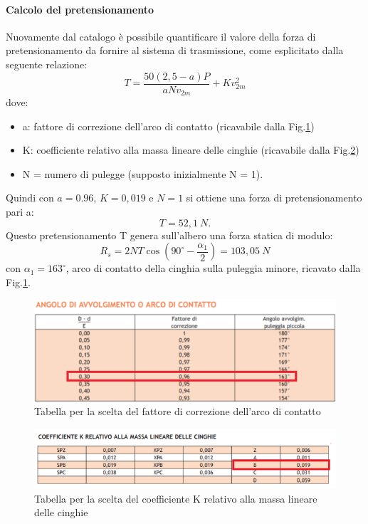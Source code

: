 \paragraph{Calcolo del pretensionamento}Nuovamente dal catalogo è possibile quantificare il valore della forza di pretensionamento da fornire al sistema di trasmissione, come esplicitato dalla seguente relazione: 
\begin{equation}
    T=\frac{50\left(2,5-a\right) P}{a N v_{2m}}+Kv_{2m}^2
\end{equation}
dove: 
\begin{itemize}
    \item a: fattore di correzione dell’arco di contatto (ricavabile dalla Fig.\ref{fig:ArcoDiContatto}) 
    \item K: coefficiente relativo alla massa lineare delle cinghie (ricavabile dalla Fig.\ref{fig:CoefficienteK})
    \item N = numero di pulegge (supposto inizialmente N = 1).
\end{itemize}
Quindi con $a=0.96$, $K=0,019$ e $N=1$ si ottiene una forza di pretensionamento pari a: 
\begin{equation}
    T=52,1\ N.
\end{equation}
Questo pretensionamento T genera sull’albero una forza statica di modulo: 
\begin{equation}
    R_s=2NT\cos\left(90^\circ-\frac{\alpha_1}{2}\right)=103,05\ N
\end{equation}
con $\alpha_1=163^\circ$, arco di contatto della cinghia sulla puleggia minore, ricavato dalla Fig.\ref{fig:ArcoDiContatto}.
\begin{figure}[h]
    \centering
    \includegraphics[scale=0.54]{Immagini/ArcoDiContatto.png}
    \caption{Tabella per la scelta del fattore di correzione dell'arco di contatto}
    \label{fig:ArcoDiContatto}
\end{figure}
\newpage
\begin{figure}[h]
    \centering
    \includegraphics[scale=0.8]{Immagini/CoefficienteK.png}
    \caption{Tabella per la scelta del coefficiente K relativo alla massa lineare delle cinghie}
    \label{fig:CoefficienteK}
\end{figure}
